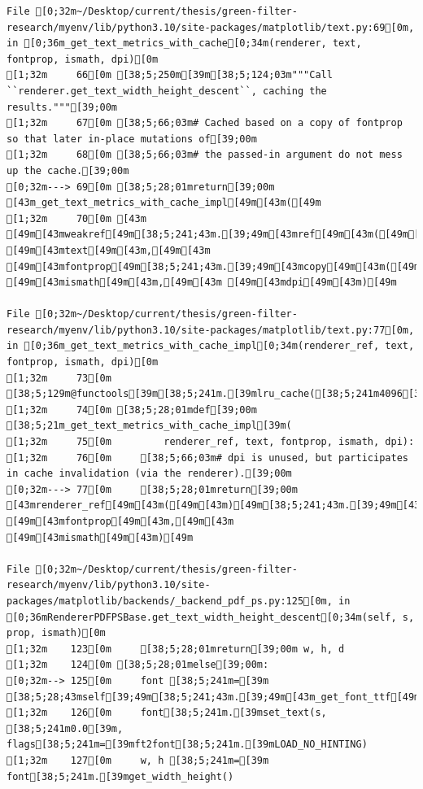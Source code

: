 \documentclass[
  letterpaper,
  DIV=11,
  numbers=noendperiod]{scrartcl}
\begin{document}
\begin{verbatim}
File [0;32m~/Desktop/current/thesis/green-filter-research/myenv/lib/python3.10/site-packages/matplotlib/text.py:69[0m, in [0;36m_get_text_metrics_with_cache[0;34m(renderer, text, fontprop, ismath, dpi)[0m
[1;32m     66[0m [38;5;250m[39m[38;5;124;03m"""Call ``renderer.get_text_width_height_descent``, caching the results."""[39;00m
[1;32m     67[0m [38;5;66;03m# Cached based on a copy of fontprop so that later in-place mutations of[39;00m
[1;32m     68[0m [38;5;66;03m# the passed-in argument do not mess up the cache.[39;00m
[0;32m---> 69[0m [38;5;28;01mreturn[39;00m [43m_get_text_metrics_with_cache_impl[49m[43m([49m
[1;32m     70[0m [43m    [49m[43mweakref[49m[38;5;241;43m.[39;49m[43mref[49m[43m([49m[43mrenderer[49m[43m)[49m[43m,[49m[43m [49m[43mtext[49m[43m,[49m[43m [49m[43mfontprop[49m[38;5;241;43m.[39;49m[43mcopy[49m[43m([49m[43m)[49m[43m,[49m[43m [49m[43mismath[49m[43m,[49m[43m [49m[43mdpi[49m[43m)[49m

File [0;32m~/Desktop/current/thesis/green-filter-research/myenv/lib/python3.10/site-packages/matplotlib/text.py:77[0m, in [0;36m_get_text_metrics_with_cache_impl[0;34m(renderer_ref, text, fontprop, ismath, dpi)[0m
[1;32m     73[0m [38;5;129m@functools[39m[38;5;241m.[39mlru_cache([38;5;241m4096[39m)
[1;32m     74[0m [38;5;28;01mdef[39;00m [38;5;21m_get_text_metrics_with_cache_impl[39m(
[1;32m     75[0m         renderer_ref, text, fontprop, ismath, dpi):
[1;32m     76[0m     [38;5;66;03m# dpi is unused, but participates in cache invalidation (via the renderer).[39;00m
[0;32m---> 77[0m     [38;5;28;01mreturn[39;00m [43mrenderer_ref[49m[43m([49m[43m)[49m[38;5;241;43m.[39;49m[43mget_text_width_height_descent[49m[43m([49m[43mtext[49m[43m,[49m[43m [49m[43mfontprop[49m[43m,[49m[43m [49m[43mismath[49m[43m)[49m

File [0;32m~/Desktop/current/thesis/green-filter-research/myenv/lib/python3.10/site-packages/matplotlib/backends/_backend_pdf_ps.py:125[0m, in [0;36mRendererPDFPSBase.get_text_width_height_descent[0;34m(self, s, prop, ismath)[0m
[1;32m    123[0m     [38;5;28;01mreturn[39;00m w, h, d
[1;32m    124[0m [38;5;28;01melse[39;00m:
[0;32m--> 125[0m     font [38;5;241m=[39m [38;5;28;43mself[39;49m[38;5;241;43m.[39;49m[43m_get_font_ttf[49m[43m([49m[43mprop[49m[43m)[49m
[1;32m    126[0m     font[38;5;241m.[39mset_text(s, [38;5;241m0.0[39m, flags[38;5;241m=[39mft2font[38;5;241m.[39mLOAD_NO_HINTING)
[1;32m    127[0m     w, h [38;5;241m=[39m font[38;5;241m.[39mget_width_height()


\end{verbatim}
\end{document}
